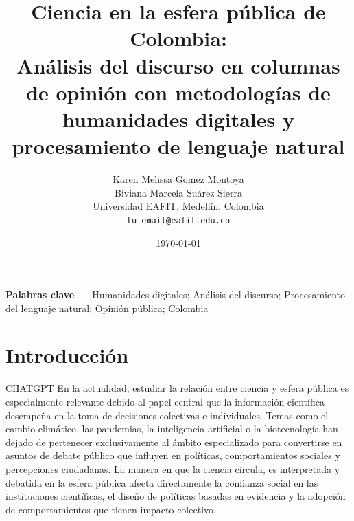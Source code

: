\documentclass[11pt,a4paper]{article}
\title{Ciencia en la esfera pública de Colombia: \\
	Análisis del discurso en columnas de opinión con metodologías de humanidades digitales y procesamiento de lenguaje natural}
\author{
	Karen Melissa Gomez Montoya\\
	Biviana Marcela Suárez Sierra\\
	\small Universidad EAFIT, Medellín, Colombia\\
	\small \texttt{tu-email@eafit.edu.co}
}
\date{\today}
\newcommand{\keywords}[1]{\par\noindent\textbf{Palabras clave —} #1}
\newcommand{\JEL}[1]{\par\noindent\textbf{Clasificación —} #1}
\begin{document}
	\maketitle
	
	\begin{abstract}
		
	\end{abstract}
	
	\keywords{Humanidades digitales; Análisis del discurso; Procesamiento del lenguaje natural; Opinión pública; Colombia}
	

	\section{Introducción}
	
	CHATGPT
	En la actualidad, estudiar la relación entre ciencia y esfera pública es especialmente relevante debido al papel central que la información científica desempeña en la toma de decisiones colectivas e individuales. Temas como el cambio climático, las pandemias, la inteligencia artificial o la biotecnología han dejado de pertenecer exclusivamente al ámbito especializado para convertirse en asuntos de debate público que influyen en políticas, comportamientos sociales y percepciones ciudadanas. La manera en que la ciencia circula, es interpretada y debatida en la esfera pública afecta directamente la confianza social en las instituciones científicas, el diseño de políticas basadas en evidencia y la adopción de comportamientos que tienen impacto colectivo.
	
\end{document}
